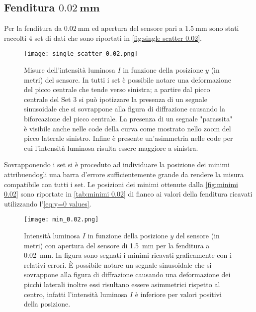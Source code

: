 \documentclass[../main.tex]{subfiles}
\begin{document}
\subsection{Fenditura $\mathbf{\qty{0.02}{\mm}}$}

Per la fenditura da $\qty{0.02}{\mm}$ ed apertura del sensore pari a $\qty{1.5}{\mm}$ sono stati raccolti $4$ set di dati che sono riportati in \autoref{fig:single scatter 0.02}.

\begin{figure}[ht!]
    \centering
    \texttt{[image: single\_scatter\_0.02.png]}
    \caption{Misure dell'intensità luminosa $I$ in funzione della posizione $y$ (in metri) del sensore. In tutti i set è possibile notare una deformazione del picco centrale che tende verso sinistra; a partire dal picco centrale del Set $3$ si può ipotizzare la presenza di un segnale sinusoidale che si sovrappone alla figura di diffrazione causando la biforcazione del picco centrale. La presenza di un segnale "parassita" è visibile anche nelle code della curva come mostrato nello zoom del picco laterale sinistro. Infine è presente un'asimmetria nelle code per cui l'intensità luminosa risulta essere maggiore a sinistra.}
    \label{fig:single scatter 0.02}
\end{figure}

Sovrapponendo i set si è proceduto ad individuare la posizione dei minimi attribuendogli una barra d'errore sufficientemente grande da rendere la misura compatibile con tutti i set. Le posizioni dei minimi ottenute dalla \autoref{fig:minimi 0.02} sono riportate in \autoref{tab:minimi 0.02} di fianco ai valori della fenditura ricavati utilizzando l'\autoref{eq:y=0 values}.

\begin{figure}[ht!]
    \centering
    \texttt{[image: min\_0.02.png]}
    \caption{Intensità luminosa $I$ in funzione della posizione $y$ del sensore (in metri) con apertura del sensore di \qty{1.5}{\mm} per la fenditura a \qty{0.02}{\mm}. In figura sono segnati i minimi ricavati graficamente con i relativi errori. È possibile notare un segnale sinusoidale che si sovrappone alla figura di diffrazione causando una deformazione dei picchi laterali inoltre essi risultano essere asimmetrici rispetto al centro, infatti l'intensità luminosa $I$ è inferiore per valori positivi della posizione.
    } %
    \label{fig:minimi 0.02}
\end{figure}
\end{document}
